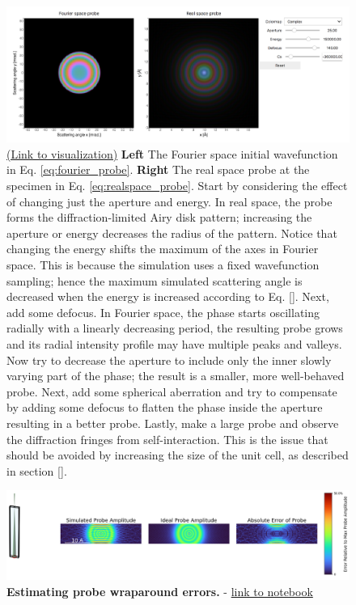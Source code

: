 \documentclass[%
 superscriptaddress,
 aip,
 amsmath,amssymb,
preprint,%
 author-year,%
longbibliography
]{revtex4-2}
\begin{document}
\begin{figure}[h]
    \includegraphics[width=1\textwidth]{figures/probe.png}
    \caption{ \href{https://boiling-wildwood-85903.herokuapp.com/voila/render/probes.ipynb}{(Link to visualization)}
    \textbf{Left} The Fourier space initial wavefunction in Eq. \eqref{eq:fourier_probe}. \textbf{Right} The real space probe at the specimen in Eq. \eqref{eq:realspace_probe}.
    Start by considering the effect of changing just the aperture and energy. In real space, the probe forms the diffraction-limited Airy disk pattern; increasing the aperture or energy decreases the radius of the pattern. Notice that changing the energy shifts the maximum of the axes in Fourier space. This is because the simulation uses a fixed wavefunction sampling; hence the maximum simulated scattering angle is decreased when the energy is increased according to Eq. \ref{}.
    Next, add some defocus. In Fourier space, the phase starts oscillating radially with a linearly decreasing period, the resulting probe grows and its radial intensity profile may have multiple peaks and valleys. Now try to decrease the aperture to include only the inner slowly varying part of the phase; the result is a smaller, more well-behaved probe. Next, add some spherical aberration and try to compensate by adding some defocus to flatten the phase inside the aperture resulting in a better probe.
    Lastly, make a large probe and observe the diffraction fringes from self-interaction. This is the issue that should be avoided by increasing the size of the unit cell, as described in section \ref{}.}
    \label{vis:probe}
\end{figure}




\begin{figure}[htbp]
    \centering
    \includegraphics[width=6.4
    in]{figures/probe_overlap.png}
    \caption{{\bf Estimating probe wraparound errors.} - \href{https://github.com/tem-elements/tem-elements/blob/main/notebooks/Probe_overlap.ipynb}{link to notebook}}
    \label{Fig:probe_overlap}
\end{figure}
\end{document}
